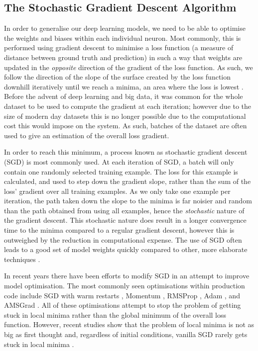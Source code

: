 \subsection{The Stochastic Gradient Descent Algorithm}\label{ch:Background,sec:DLIntro,sub:stochasticgradientdescent}
In order to generalise our deep learning models, we need to be able to optimise the weights and biases within each individual neuron. Most commonly, this is performed using gradient descent to minimise a loss function (a measure of distance between ground truth and prediction)  in such a way that weights are updated in the \textit{opposite} direction of the gradient of the loss function. As such, we follow the direction of the slope of the surface created by the loss function downhill iteratively until we reach a minima, an area where the loss is lowest \cite{ruder_overview_2016}. Before the advent of deep learning and big data, it was common for the whole dataset to be used to compute the gradient at each iteration; however due to the size of modern day datasets this is no longer possible due to the computational cost this would impose on the system. As such, batches of the dataset are often used to give an estimation of the overall loss gradient.

In order to reach this minimum, a process known as stochastic gradient descent (SGD) is most commonly used. At each iteration of SGD, a batch will only contain one randomly selected training example. The loss for this example is calculated, and used to step down the gradient slope, rather than the sum of the loss' gradient over all training examples. As we only take one example per iteration, the path taken down the slope to the minima is far noisier and random than the path obtained from using all examples, hence the \textit{stochastic} nature of the gradient descent. This stochastic nature does result in a longer convergence time to the minima compared to a regular gradient descent, however this is outweighed by the reduction in computational expense. The use of SGD often leads to a good set of model weights quickly compared to other, more elaborate techniques \cite{bottou_tradeoffs_2008}. 

In recent years there have been efforts to modify SGD in an attempt to improve model optimisation. The most commonly seen optimisations within production code include SGD with warm restarts \cite{loshchilov_sgdr:_2016}, Momentum \cite{qian_momentum_1999}, RMSProp \cite{tieleman_lecture_2012}, Adam \cite{kingma_adam:_2014}, and AMSGrad \cite{reddi_convergence_2019}. All of these optimisations attempt to stop the problem of getting stuck in local minima rather than the global minimum of the overall loss function. However, recent studies show that the problem of local minima is not as big as first thought and, regardless of initial conditions, vanilla SGD rarely gets stuck in local minima \cite{dauphin_identifying_2014, choromanska_loss_2015}.

